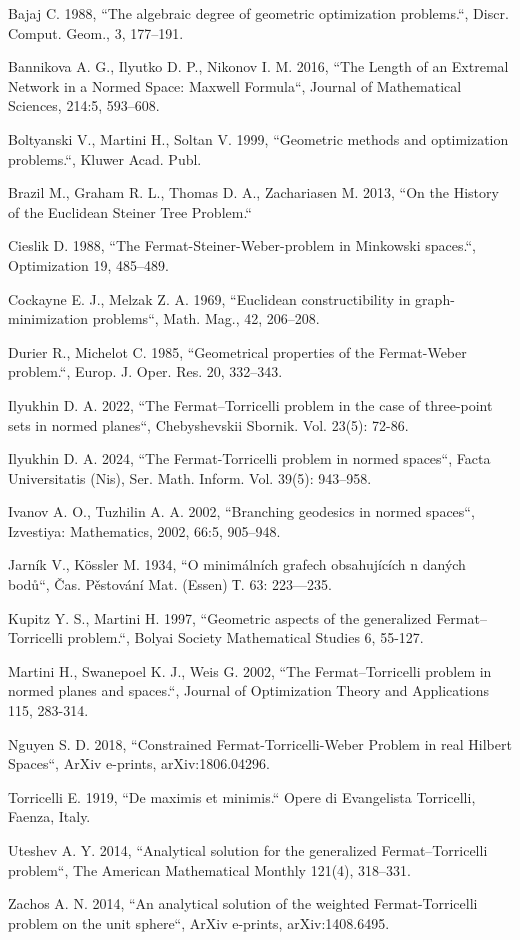 \documentclass[12pt,a4paper]{article}
\numberwithin{equation}{section}
\numberwithin{figure}{section}
\begin{document}
\begin{enumerate}[label={[\arabic*]}]
    \item Bajaj C. 1988, “The algebraic degree of geometric optimization problems.“, Discr. Comput. Geom., 3, 177–191.
    \item Bannikova A. G., Ilyutko D. P., Nikonov I. M. 2016, “The Length of an Extremal Network in a Normed Space: Maxwell Formula“, Journal of Mathematical Sciences, 214:5, 593–608.
    \item Boltyanski V., Martini H., Soltan V. 1999, “Geometric methods and optimization problems.“, Kluwer Acad. Publ.
    \item Brazil M., Graham R. L., Thomas D. A., Zachariasen M. 2013, “On the History of the Euclidean Steiner Tree Problem.“
    \item Cieslik D. 1988, “The Fermat-Steiner-Weber-problem in Minkowski spaces.“, Optimization 19, 485–489.
    \item Cockayne E. J., Melzak Z. A. 1969, “Euclidean constructibility in graph-minimization problems“, Math. Mag., 42, 206–208.
    \item Durier R., Michelot C. 1985, “Geometrical properties of the Fermat-Weber problem.“, Europ. J. Oper. Res. 20, 332–343.
    \item Ilyukhin D. A. 2022, “The Fermat–Torricelli problem in the case of three-point sets in normed planes“, Chebyshevskii Sbornik. Vol. 23(5): 72-86.
    \item Ilyukhin D. A. 2024, “The Fermat-Torricelli problem in normed spaces“, Facta Universitatis (Nis), Ser. Math. Inform. Vol. 39(5): 943–958.
    \item Ivanov A. O., Tuzhilin A. A. 2002, “Branching geodesics in normed spaces“, Izvestiya: Mathematics, 2002, 66:5, 905–948.
    \item Jarník V., Kössler M. 1934, “O minimálních grafech obsahujících n daných bodů“, Čas. Pěstování Mat. (Essen) Т. 63: 223—235.
    \item Kupitz Y. S., Martini H. 1997, “Geometric aspects of the generalized Fermat–Torricelli problem.“, Bolyai Society Mathematical Studies 6, 55-127.
    \item Martini H., Swanepoel K. J., Weis G. 2002, “The Fermat–Torricelli problem in normed planes and spaces.“, Journal of Optimization Theory and Applications 115, 283-314.
    \item Nguyen S. D. 2018, “Constrained Fermat-Torricelli-Weber Problem in real Hilbert Spaces“, ArXiv e-prints, arXiv:1806.04296.
    \item Torricelli E. 1919, “De maximis et minimis.“ Opere di Evangelista Torricelli, Faenza, Italy.
    \item Uteshev A. Y. 2014, “Analytical solution for the generalized Fermat–Torricelli problem“, The American Mathematical Monthly 121(4), 318–331.
    \item Zachos A. N. 2014, “An analytical solution of the weighted Fermat-Torricelli problem on the unit sphere“, ArXiv e-prints, arXiv:1408.6495.
\end{enumerate}
\end{document}
